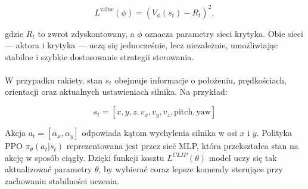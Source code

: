 \begin{equation}
L^{\text{value}}(\phi) = \left(V_\phi(s_t) - R_t\right)^2,
\end{equation}

gdzie $R_t$ to zwrot zdyskontowany, a $\phi$ oznacza parametry sieci krytyka. Obie sieci — aktora i krytyka — uczą się jednocześnie, lecz niezależnie, umożliwiając stabilne i szybkie dostosowanie strategii sterowania.

\paragraph{}

W przypadku rakiety, stan $s_t$ obejmuje informacje o położeniu, prędkościach, orientacji oraz aktualnych ustawieniach silnika. Na przykład:

\begin{equation}
s_t = [x, y, z, v_x, v_y, v_z, \text{pitch}, \text{yaw}]
\end{equation}

Akcja $a_t = [\alpha_x, \alpha_y]$ odpowiada kątom wychylenia silnika w osi \( x \) i \( y \). Polityka PPO $\pi_\theta(a_t|s_t)$ reprezentowana jest przez sieć MLP, która przekształca stan na akcję w sposób ciągły. Dzięki funkcji kosztu $L^{CLIP}(\theta)$ model uczy się tak aktualizować parametry $\theta$, by wybierać coraz lepsze komendy sterujące przy zachowaniu stabilności uczenia.


